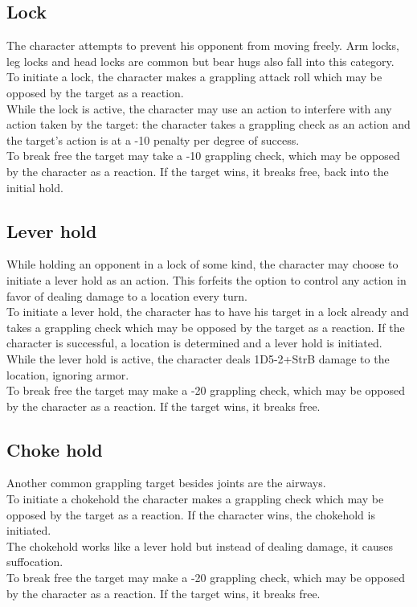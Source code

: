 \documentclass[12pt,a4paper,openany]{book}
\begin{document}
	\subsection*{Lock}
	The character attempts to prevent his opponent from moving freely. Arm locks, leg locks and head locks are common but bear hugs also fall into this category.\\
	To initiate a lock, the character makes a grappling attack roll which may be opposed by the target as a reaction.\\
	While the lock is active, the character may use an action to interfere with any action taken by the target: the character takes a grappling check as an action and the target’s action is at a -10 penalty per degree of success.\\
	To break free the target may take a -10 grappling check, which may be opposed by the character as a reaction. If the target wins, it breaks free, back into the initial hold.
	\subsection*{Lever hold}
	While holding an opponent in a lock of some kind, the character may choose to initiate a lever hold as an action. This forfeits the option to control any action in favor of dealing damage to a location every turn.\\
	To initiate a lever hold, the character has to have his target in a lock already and takes a grappling check which may be opposed by the target as a reaction. If the character is successful, a location is determined and a lever hold is initiated.\\
	While the lever hold is active, the character deals 1D5-2+StrB damage to the location, ignoring armor.\\
	To break free the target may make a -20 grappling check, which may be opposed by the character as a reaction. If the target wins, it breaks free.
	\subsection*{Choke hold}
	Another common grappling target besides joints are the airways.\\
	To initiate a chokehold the character makes a grappling check which may be opposed by the target as a reaction. If the character wins, the chokehold is initiated.\\
	The chokehold works like a lever hold but instead of dealing damage, it causes suffocation.\\
	To break free the target may make a -20 grappling check, which may be opposed by the character as a reaction. If the target wins, it breaks free.
\end{document}
